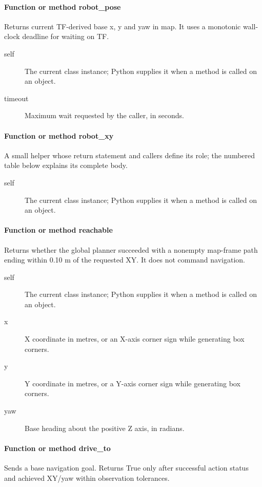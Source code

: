 \documentclass[11pt,a4paper]{book}
\begin{document}
\paragraph{Function or method robot\_pose}
Returns current TF-derived base x, y and yaw in map. It uses a monotonic wall-clock deadline for waiting on TF.

\begin{description}
\item[self] The current class instance; Python supplies it when a method is called on an object.
\item[timeout] Maximum wait requested by the caller, in seconds.
\end{description}

\paragraph{Function or method robot\_xy}
A small helper whose return statement and callers define its role; the numbered table below explains its complete body.

\begin{description}
\item[self] The current class instance; Python supplies it when a method is called on an object.
\end{description}

\paragraph{Function or method reachable}
Returns whether the global planner succeeded with a nonempty map-frame path ending within 0.10 m of the requested XY. It does not command navigation.

\begin{description}
\item[self] The current class instance; Python supplies it when a method is called on an object.
\item[x] X coordinate in metres, or an X-axis corner sign while generating box corners.
\item[y] Y coordinate in metres, or a Y-axis corner sign while generating box corners.
\item[yaw] Base heading about the positive Z axis, in radians.
\end{description}

\paragraph{Function or method drive\_to}
Sends a base navigation goal. Returns True only after successful action status and achieved XY/yaw within observation tolerances.
\end{document}
